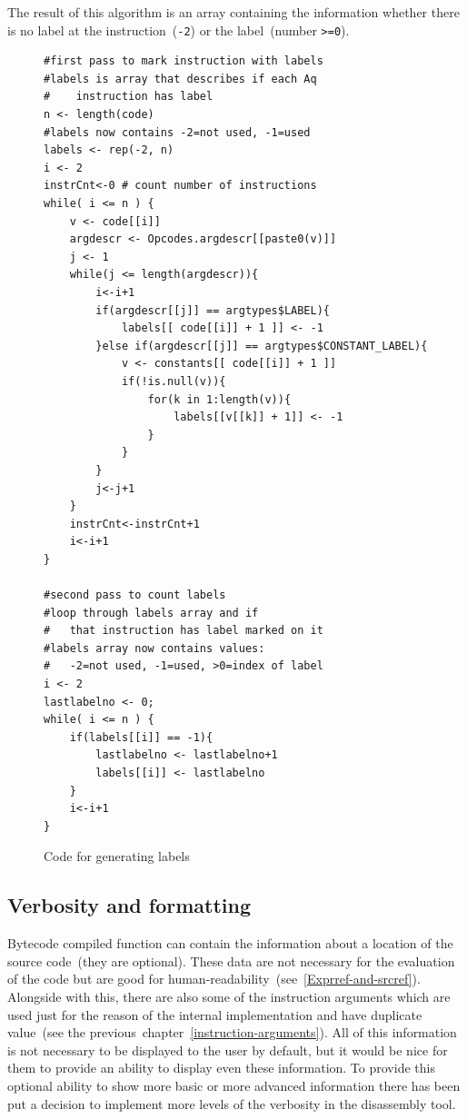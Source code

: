 \documentclass[thesis=M,english]{FITthesis}[2018/10/20]
\newcommand{\code}[1]{\texttt{#1}}
\begin{document}
The result of this algorithm is an array containing the information whether there is no label at the instruction~(\code{-2}) or the label~(number \code{>=0}).

\begin{figure}[H]
\begin{lstlisting}
#first pass to mark instruction with labels
#labels is array that describes if each	Aq
#    instruction has label
n <- length(code)
#labels now contains -2=not used, -1=used
labels <- rep(-2, n)
i <- 2
instrCnt<-0 # count number of instructions
while( i <= n ) {
    v <- code[[i]]
    argdescr <- Opcodes.argdescr[[paste0(v)]]
    j <- 1
    while(j <= length(argdescr)){
        i<-i+1
        if(argdescr[[j]] == argtypes$LABEL){
            labels[[ code[[i]] + 1 ]] <- -1
        }else if(argdescr[[j]] == argtypes$CONSTANT_LABEL){
            v <- constants[[ code[[i]] + 1 ]]
            if(!is.null(v)){
                for(k in 1:length(v)){
                    labels[[v[[k]] + 1]] <- -1
                }
            }
        }
        j<-j+1
    }
    instrCnt<-instrCnt+1
    i<-i+1
}

#second pass to count labels
#loop through labels array and if
#   that instruction has label marked on it
#labels array now contains values:
#   -2=not used, -1=used, >0=index of label
i <- 2
lastlabelno <- 0;
while( i <= n ) {
    if(labels[[i]] == -1){
        lastlabelno <- lastlabelno+1
        labels[[i]] <- lastlabelno
    }
    i<-i+1
}
\end{lstlisting}
	\caption{Code for generating labels}\label{fig:code-generating-labels}
\end{figure}

\subsection{Verbosity and formatting}\label{verbosity-and-formatting}

Bytecode compiled function can contain the information about a location of the source code~(they are optional).  These data are not necessary for the evaluation of the code but are good for human-readability~(see~\ref{Exprref-and-srcref}). Alongside with this, there are also some of the instruction arguments which are used just for the reason of the internal implementation and have duplicate value~(see the previous~chapter~\ref{instruction-arguments}). All of this information is not necessary to be displayed to the user by default, but it would be nice for them to provide an ability to display even these information. To provide this optional ability to show more basic or more advanced information there has been put a decision to implement more levels of the verbosity in the disassembly tool.
\end{document}
